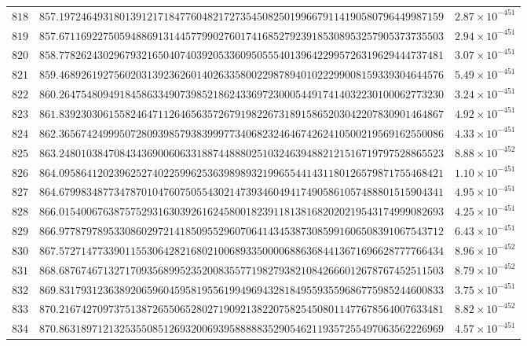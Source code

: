 \documentclass[12pt,reqno]{amsart}
\theoremstyle{remark}
\begin{document}
\begin{longtable}{clc}
$818$ & $857.1972464931801391217184776048217273545082501996679114190580796449987159$ & $2.87\times 10^{-451}$ \\
$819$ & $857.6711692275059488691314457799027601741685279239185308953257905373735503$ & $2.94\times 10^{-451}$ \\
$820$ & $858.7782624302967932165040740392053360950555401396422995726319629444737481$ & $3.07\times 10^{-451}$ \\
$821$ & $859.4689261927560203139236260140263358002298789401022299008159339304644576$ & $5.49\times 10^{-451}$ \\
$822$ & $860.2647548094918458633490739852186243369723000544917414032230100062773230$ & $3.24\times 10^{-451}$ \\
$823$ & $861.8392303061558246471126465635726791982267318915865203042207830901464867$ & $4.92\times 10^{-451}$ \\
$824$ & $862.3656742499950728093985793839997734068232464674262410500219569162550086$ & $4.33\times 10^{-451}$ \\
$825$ & $863.2480103847084343690060633188744888025103246394882121516719797528865523$ & $8.88\times 10^{-452}$ \\
$826$ & $864.0958641202396252740225996253639898932199655441431180126579871755468421$ & $1.10\times 10^{-451}$ \\
$827$ & $864.6799834877347870104760750554302147393460494174905861057488801515904341$ & $4.95\times 10^{-451}$ \\
$828$ & $866.0154006763875752931630392616245800182391181381682020219543174999082693$ & $4.25\times 10^{-451}$ \\
$829$ & $866.9778797895330860297214185095529607064143453873085991606508391067543712$ & $6.43\times 10^{-451}$ \\
$830$ & $867.5727147733901155306428216802100689335000068863684413671696628777766434$ & $8.96\times 10^{-452}$ \\
$831$ & $868.6876746713271709356899523520083557719827938210842666012678767452511503$ & $8.79\times 10^{-452}$ \\
$832$ & $869.8317931236389206596045958195561994969432818495593559686775985244600833$ & $3.75\times 10^{-451}$ \\
$833$ & $870.2167427097375138726550652802719092138220758254508011477678564007633481$ & $8.82\times 10^{-452}$ \\
$834$ & $870.8631897121325355085126932006939588888352905462119357255497063562226969$ & $4.57\times 10^{-451}$ \\

\end{longtable}
\end{document}
